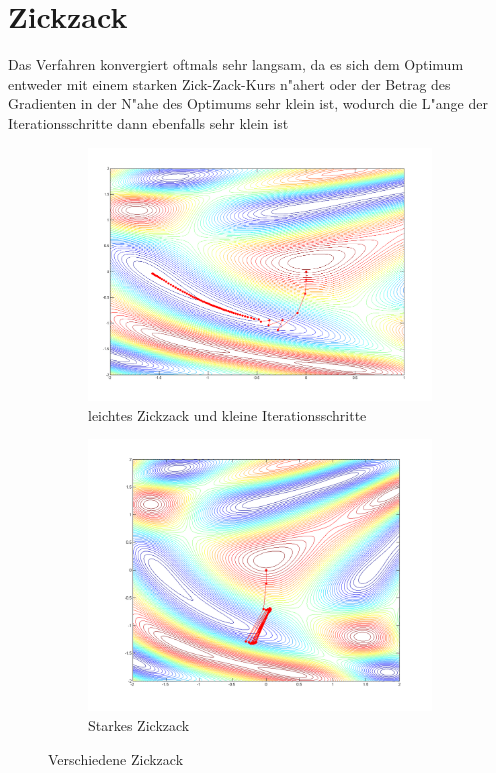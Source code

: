 \section{Zickzack}
Das Verfahren konvergiert oftmals sehr langsam, da es sich dem Optimum
entweder mit einem starken Zick-Zack-Kurs n"ahert oder der Betrag des
Gradienten in der N"ahe des Optimums sehr klein ist, wodurch die L"ange
der Iterationsschritte dann ebenfalls sehr klein ist

\begin{figure}[htb]
\centering
\begin{subfigure}[b]{0.49\textwidth}
\centering
\includegraphics[width=\textwidth]{descent/zz_3.png}
\caption{leichtes Zickzack und kleine Iterationsschritte}
\end{subfigure} \begin{subfigure}[b]{0.49\textwidth}
\centering
\includegraphics[width=\textwidth]{descent/zz_2.png}
\caption{Starkes Zickzack}\label{zickzackb}
\end{subfigure}
\caption{Verschiedene Zickzack}\label{zickzack}
\end{figure}


